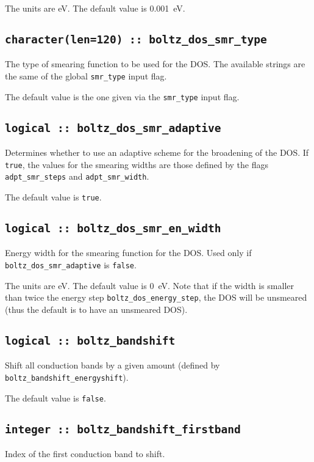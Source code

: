 The units are eV.
The default value is 0.001~eV.

\subsection[boltz\_dos\_smr\_type]{\tt character(len=120) :: boltz\_dos\_smr\_type}
The type of smearing function to be used for the DOS. The available strings are the same of the global {\tt smr\_type} input flag. 

The default value is the one given via the {\tt smr\_type} input flag. 


\subsection[boltz\_dos\_smr\_adaptive]{\tt logical :: boltz\_dos\_smr\_adaptive}
Determines whether to use an adaptive scheme for the broadening of the DOS. If \verb#true#, the values for the smearing widths are those defined by the flags {\tt adpt\_smr\_steps} and {\tt adpt\_smr\_width}.

The default value is \verb#true#.

\subsection[boltz\_dos\_smr\_en\_width]{\tt logical :: boltz\_dos\_smr\_en\_width}
Energy width for the smearing function for the DOS. Used only if {\tt boltz\_dos\_smr\_adaptive} is \verb#false#.

The units are eV.
The default value is 0~eV. Note that if the width is smaller than twice the energy step {\tt boltz\_dos\_energy\_step}, the DOS will be unsmeared (thus the default is to have an unsmeared DOS).


\subsection[boltz\_bandshift]{\tt logical :: boltz\_bandshift}
Shift all conduction bands by a given amount (defined by {\tt boltz\_bandshift\_energyshift}).

The default value is \verb#false#.

\subsection[boltz\_bandshift\_firstband]{\tt integer :: boltz\_bandshift\_firstband}
Index of the first conduction band to shift.

